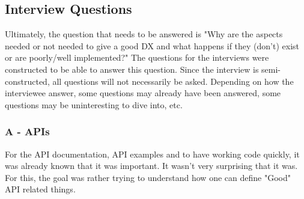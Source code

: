\documentclass{cslthse-msc}
\begin{document}
    \subsection{Interview Questions}

    Ultimately, the question that needs to be answered is "Why are the aspects needed or not needed
    to give a good DX and what happens if they (don’t) exist or are poorly/well implemented?"
    The questions for the interviews were constructed to be able to answer this question.
    Since the interview is semi-constructed, all questions will not necessarily be asked.
    Depending on how the interviewee answer, some questions may already have been answered,
    some questions may be uninteresting to dive into, etc.
    \subsubsection{A - APIs}
    For the API documentation, API examples and to have working code quickly, it was already known that it was important. It wasn't very surprising that it was.
    For this, the goal was rather trying to understand how one can define "Good" API related things.
\end{document}
